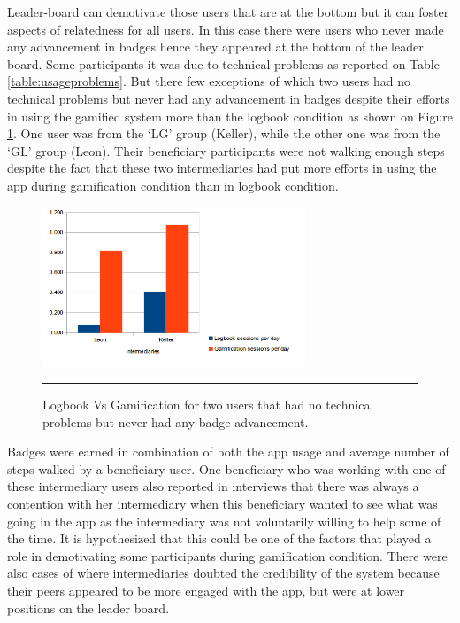Leader-board can demotivate those users that are at the bottom but it can foster aspects of relatedness for all users\citep{sailer2013:psychological}. In this case there were users who never made any advancement in badges hence they appeared at the bottom of the leader board. Some participants it was due to technical problems as reported on Table \ref{table:usageproblems}. But there few exceptions of which two users had no technical problems but never had any advancement in badges despite their efforts in using the gamified system more than the logbook condition as shown on Figure \ref{figure:badge_failure_2}. One user was from the `LG' group (Keller), while the other one was from the `GL' group (Leon).  Their beneficiary participants were not walking enough steps despite the fact that these two intermediaries had put  more efforts in using the app during gamification condition than in logbook condition.
\begin{figure}[htbp]
  \centering
    \includegraphics[width=0.7\textwidth]{Figures/badgesfailures2.png}
    \rule{35em}{0.5pt}
  \caption{Logbook Vs Gamification for two users that had no technical problems but never had any badge advancement.}
  \label{figure:badge_failure_2}
\end{figure}

Badges were earned in combination of both the app usage and average number of steps walked by a beneficiary user. One beneficiary who was working with one of these intermediary users also reported in interviews that there was always a contention with her intermediary when this beneficiary wanted to see what was going in the app as the intermediary was not voluntarily willing to help some of the time. It is hypothesized that this could be one of the factors that played a role in demotivating some participants during gamification condition. There were also cases of  where intermediaries doubted the credibility of the system because their peers appeared to be more engaged with the app, but were at lower positions on the leader board. 

